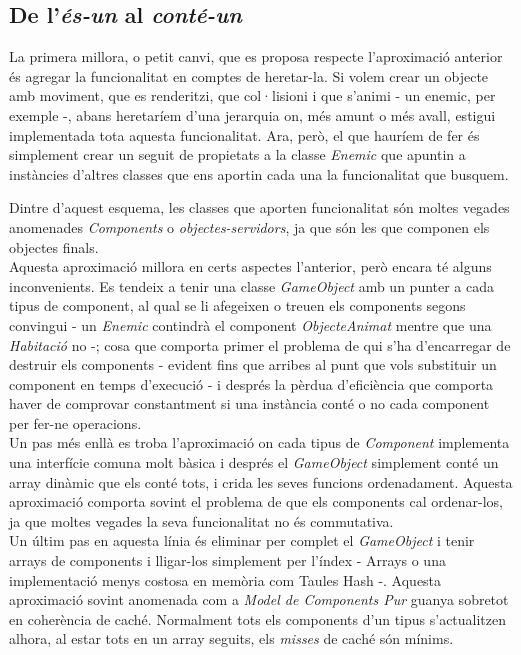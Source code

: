 \begin{description}
\end{description}

\subsection{De l'{\em és-un} al {\em conté-un}}

La primera millora, o petit canvi, que es proposa respecte l'aproximació anterior és agregar la funcionalitat en comptes de heretar-la. Si volem crear un objecte amb moviment, que es renderitzi, que col·lisioni i que s'animi - un enemic, per exemple -, abans heretaríem d'una jerarquia on, més amunt o més avall, estigui implementada tota aquesta funcionalitat. Ara, però, el que hauríem de fer és simplement crear un seguit de propietats a la classe {\em Enemic} que apuntin a instàncies d'altres classes que ens aportin cada una la funcionalitat que busquem.

Dintre d'aquest esquema, les classes que aporten funcionalitat són moltes vegades anomenades {\em Components} o {\em objectes-servidors}, ja que són les que componen els objectes finals.
\\

Aquesta aproximació millora en certs aspectes l'anterior, però encara té alguns inconvenients. Es tendeix a tenir una classe {\em GameObject} amb un punter a cada tipus de component, al qual se li afegeixen o treuen els components segons convingui - un {\em Enemic} contindrà el component {\em ObjecteAnimat} mentre que una {\em Habitació} no -; cosa que comporta primer el problema de qui s'ha d'encarregar de destruir els components - evident fins que arribes al punt que vols substituir un component en temps d'execució - i després la pèrdua d'eficiència que comporta haver de comprovar constantment si una instància conté o no cada component per fer-ne operacions.
\\

Un pas més enllà es troba l'aproximació on cada tipus de {\em Component} implementa una interfície comuna molt bàsica i després el {\em GameObject} simplement conté un array dinàmic que els conté tots, i crida les seves funcions ordenadament. Aquesta aproximació comporta sovint el problema de que els components cal ordenar-los, ja que moltes vegades la seva funcionalitat no és commutativa.
\\

Un últim pas en aquesta línia és eliminar per complet el {\em GameObject} i tenir arrays de components i lligar-los simplement per l'índex - Arrays o una implementació menys costosa en memòria com Taules Hash -. Aquesta aproximació sovint anomenada com a {\em Model de Components Pur} guanya sobretot en coherència de caché. Normalment tots els components d'un tipus s'actualitzen alhora, al estar tots en un array seguits, els {\em misses} de caché són mínims.
\\

